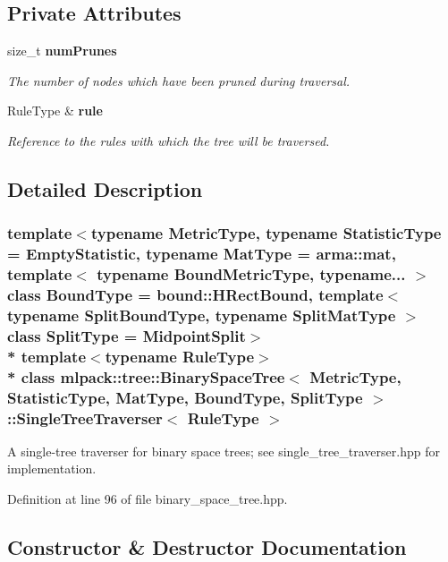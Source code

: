 \subsection*{Private Attributes}
\begin{DoxyCompactItemize}
\item 
size\+\_\+t {\bf num\+Prunes}
\begin{DoxyCompactList}\small\item\em The number of nodes which have been pruned during traversal. \end{DoxyCompactList}\item 
Rule\+Type \& {\bf rule}
\begin{DoxyCompactList}\small\item\em Reference to the rules with which the tree will be traversed. \end{DoxyCompactList}\end{DoxyCompactItemize}


\subsection{Detailed Description}
\subsubsection*{template$<$typename Metric\+Type, typename Statistic\+Type = Empty\+Statistic, typename Mat\+Type = arma\+::mat, template$<$ typename Bound\+Metric\+Type, typename... $>$ class Bound\+Type = bound\+::\+H\+Rect\+Bound, template$<$ typename Split\+Bound\+Type, typename Split\+Mat\+Type $>$ class Split\+Type = Midpoint\+Split$>$\\*
template$<$typename Rule\+Type$>$\\*
class mlpack\+::tree\+::\+Binary\+Space\+Tree$<$ Metric\+Type, Statistic\+Type, Mat\+Type, Bound\+Type, Split\+Type $>$\+::\+Single\+Tree\+Traverser$<$ Rule\+Type $>$}

A single-\/tree traverser for binary space trees; see single\+\_\+tree\+\_\+traverser.\+hpp for implementation. 



Definition at line 96 of file binary\+\_\+space\+\_\+tree.\+hpp.



\subsection{Constructor \& Destructor Documentation}
